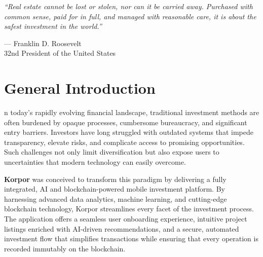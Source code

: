 \thispagestyle{empty}

\vspace*{\fill}

\begin{center}
\begin{minipage}{0.85\textwidth}
    \begin{center}
        \large\itshape ``Real estate cannot be lost or stolen, nor can it be carried away. Purchased with common sense, paid for in full, and managed with reasonable care, it is about the safest investment in the world.''\cite{RooseveltRealEstateQuote}
        
        \vspace{0.8cm}
        
        \normalfont\textcolor{primary}{— Franklin D. Roosevelt}\\
        \small\textcolor{secondary}{32nd President of the United States}
    \end{center}
\end{minipage}
\end{center}

\vspace*{\fill}

\newpage
\thispagestyle{empty}

\chapter*{\centering General Introduction}

\begingroup
\setlength{\parindent}{0pt}
\setlength{\parskip}{0.6em}
\small

n today's rapidly evolving financial landscape, traditional investment methods are often burdened by opaque processes, cumbersome bureaucracy, and significant entry barriers. Investors have long struggled with outdated systems that impede transparency, elevate risks, and complicate access to promising opportunities. Such challenges not only limit diversification but also expose users to uncertainties that modern technology can easily overcome.

\vspace{0.3cm}

\noindent \textbf{\textcolor{primary}{Korpor}} was conceived to transform this paradigm by delivering a fully integrated, AI and blockchain-powered mobile investment platform. By harnessing advanced data analytics, machine learning, and cutting-edge blockchain technology, Korpor streamlines every facet of the investment process. The application offers a seamless user onboarding experience, intuitive project listings enriched with AI-driven recommendations, and a secure, automated investment flow that simplifies transactions while ensuring that every operation is recorded immutably on the blockchain.

